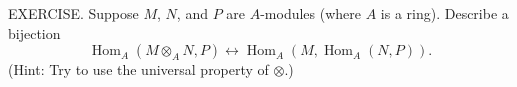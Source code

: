 EXERCISE. Suppose $M$, $N$, and $P$ are $A$-modules (where $A$ is a ring). Describe a bijection
$$\operatorname{Hom}_A(M\otimes_A N,P)\leftrightarrow\operatorname{Hom}_A(M,\operatorname{Hom}_A(N,P)).$$
(Hint: Try to use the universal property of $\otimes$.)
